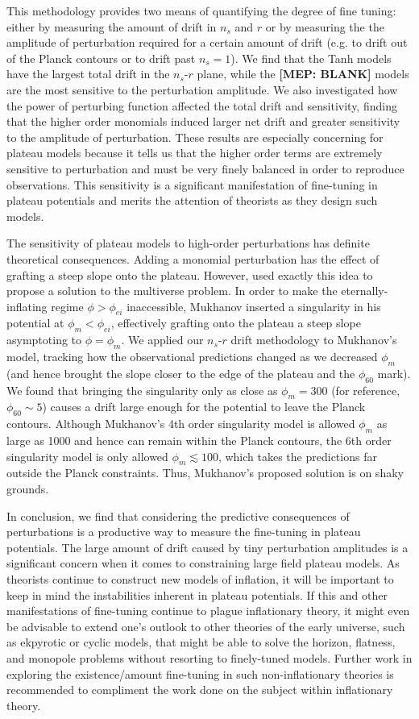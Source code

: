 \documentclass[a4paper,11pt]{article}
\def\nsr{$n_s$-$r$ }
\newcommand{\mep}[1]{{\color{applegreen} \textbf{[MEP:  #1]}}}
\begin{document}
This methodology provides two means of quantifying the degree of fine tuning: either by measuring the amount of drift in $n_s$ and $r$ or by measuring the the amplitude of perturbation required for a certain amount of drift (e.g. to drift out of the Planck contours or to drift past $n_s=1$). We find that the Tanh models have the largest total drift in the \nsr plane, while the \mep{BLANK} models are the most sensitive to the perturbation amplitude. We also investigated how the power of perturbing function affected the total drift and sensitivity, finding that the higher order monomials induced larger net drift and greater sensitivity to the amplitude of perturbation. These results are especially concerning for plateau models because it tells us that the higher order terms are extremely sensitive to perturbation and must be very finely balanced in order to reproduce observations. This sensitivity is a significant manifestation of fine-tuning in plateau potentials and merits the attention of theorists as they design such models.

The sensitivity of plateau models to high-order perturbations has definite theoretical consequences. Adding a monomial perturbation has the effect of grafting a steep slope onto the plateau. However, \citet{Mukhanov2014} used exactly this idea to propose a solution to the multiverse problem. In order to make the eternally-inflating regime $\phi>\phi_{ei}$ inaccessible, Mukhanov inserted a singularity in his potential at $\phi_m<\phi_{ei}$, effectively grafting onto the plateau a steep slope asymptoting to $\phi=\phi_m$. We applied our \nsr drift methodology to Mukhanov's model, tracking how the observational predictions changed as we decreased $\phi_m$ (and hence brought the slope closer to the edge of the plateau and the $\phi_{60}$ mark). We found that bringing the singularity only as close as $\phi_m=300$ (for reference, $\phi_{60}\sim5$) causes a drift large enough for the potential to leave the Planck contours. Although Mukhanov's 4th order singularity model is allowed $\phi_m$ as large as 1000 and hence can remain within the Planck contours, the 6th order singularity model is only allowed $\phi_m\lesssim100$, which takes the predictions far outside the Planck constraints. Thus, Mukhanov's proposed solution is on shaky grounds. 

\newpage
In conclusion, we find that considering the predictive consequences of perturbations is a productive way to measure the fine-tuning in plateau potentials. The large amount of drift caused by tiny perturbation amplitudes is a significant concern when it comes to constraining large field plateau models. As theorists continue to construct new models of inflation, it will be important to keep in mind the instabilities inherent in plateau potentials. If this and other manifestations of fine-tuning continue to plague inflationary theory, it might even be advisable to extend one's outlook to other theories of the early universe, such as ekpyrotic or cyclic models, that might be able to solve the horizon, flatness, and monopole problems without resorting to finely-tuned models. Further work in exploring the existence/amount fine-tuning in such non-inflationary theories is recommended to compliment the work done on the subject within inflationary theory. 



\newpage


\end{document}
